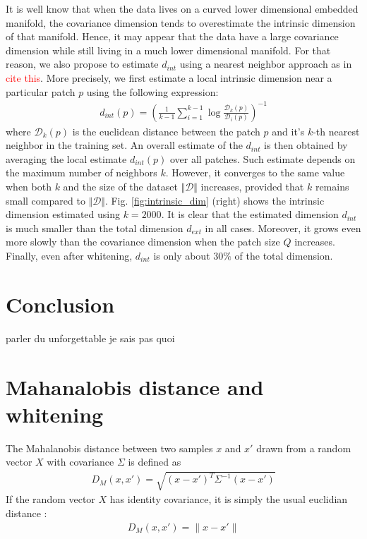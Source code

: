 \documentclass{article}
\begin{document}
{It is well know that when the data lives on a curved lower dimensional embedded manifold, the covariance dimension tends to overestimate the intrinsic dimension of that manifold. Hence, it may appear that the data have a large covariance dimension while still living in a much lower dimensional manifold. For that reason, we also propose to estimate $d_{int}$ using a nearest neighbor approach as in \textcolor{red}{cite this}. More precisely, we first estimate a local intrinsic dimension near a particular patch $p$ using the following expression:
\begin{align}
	d_{int}(p) = \left( \frac{1}{k-1} \sum_{i=1}^{k-1}\log \frac{\mathcal{D}_k(p)}{\mathcal{D}_i(p)} \right)^{-1} 
\end{align}
where $\mathcal{D}_k(p)$ is the euclidean distance between the patch $p$ and it's $k$-th nearest neighbor in the training set. 
An overall estimate of the $d_{int}$ is then obtained by averaging the local estimate $d_{int}(p)$ over all patches. Such estimate depends on the maximum number of neighbors $k$. However, it converges to the same value when both $k$ and the size of the dataset $\Vert \mathcal{D}\Vert$ increases, provided that $k$ remains small compared to  $\Vert \mathcal{D}\Vert$. Fig. \ref{fig:intrinsic_dim} (right) shows the intrinsic dimension estimated using $k=2000$. It is clear that the estimated dimension $d_{int}$ is much smaller than the total dimension $d_{ext}$ in all cases. Moreover, it grows even more slowly than the covariance dimension when the patch size $Q$ increases. Finally, even after whitening, $d_{int}$ is only about $30\%$ of the total dimension.   
\section{Conclusion}
parler du unforgettable je sais pas quoi




{}

\newpage

\appendix

\section{Mahanalobis distance and whitening}

The Mahalanobis distance \citep{chandra1936generalised, mclachlan1999mahalanobis} between two samples $x$ and $x'$ drawn from a random vector $X$ with covariance $\Sigma$ is defined as  
\begin{align*} D_M (x, x' ) =  \sqrt{ (x - x')^T \Sigma^{-1} (x - x')} \end{align*}
If the random vector $X$ has identity covariance, it is simply the usual euclidian distance :
\begin{align*} D_M (x, x' ) =  \| x - x' \| \end{align*}

}
\end{document}
